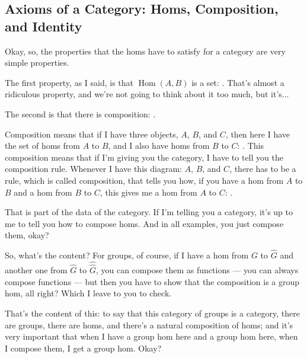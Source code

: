 \begin{speech}[01:11:29 - 01:12:07]
\end{speech}

\begin{hidden}
\end{hidden}

\subsection{Axioms of a Category: Homs, Composition, and Identity}

\begin{speech}[01:12:07 - 01:14:06]
Okay, so, the properties that the homs have to satisfy for a category are very simple properties.

The first property, as I said, is that $\operatorname{Hom}(A, B)$ is a set: . That's almost a ridiculous property, and we're not going to think about it too much, but it's...

The second is that there is composition: .

Composition means that if I have three objects, $A$, $B$, and $C$,  then here I have the set of homs from $A$ to $B$,  and I also have homs from $B$ to $C$: . This composition means that if I'm giving you the category, I have to tell you the composition rule. Whenever I have this diagram: $A$, $B$, and $C$, there has to be a rule, which is called composition, that tells you how, if you have a hom from $A$ to $B$ and a hom from $B$ to $C$, this gives me a hom from $A$ to $C$: .

That is part of the data of the category. If I'm telling you a category, it's up to me to tell you how to compose homs. And in all examples, you just compose them, okay?

So, what's the content? For groups, of course, if I have a hom from $G$ to $\hat{G}$ and another one from $\hat{G}$ to $\hat{\hat{G}}$, you can compose them as functions --- you can always compose functions --- but then you have to show that the composition is a group hom, all right? Which I leave to you to check.

That's the content of this: to say that this category of groups is a category, there are groups, there are homs, and there's a natural composition of homs; and it's very important that when I have a group hom here and a group hom here, when I compose them, I get a group hom. Okay?
\end{speech}

